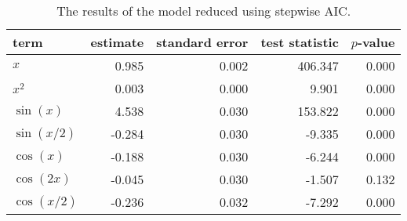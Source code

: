 \begin{table}[t]

\caption{\label{tab:stepwise-regression}The results of the model reduced using stepwise \ac{AIC}.}
\centering
\begin{tabular}{lrrrr}
\toprule
term & estimate & standard error & test statistic & \(p\)-value\\
\midrule
\(x\) & 0.985 & 0.002 & 406.347 & 0.000\\
\(x^2\) & 0.003 & 0.000 & 9.901 & 0.000\\
\(\sin(x)\) & 4.538 & 0.030 & 153.822 & 0.000\\
\(\sin(x/2)\) & -0.284 & 0.030 & -9.335 & 0.000\\
\(\cos(x)\) & -0.188 & 0.030 & -6.244 & 0.000\\
\(\cos(2x)\) & -0.045 & 0.030 & -1.507 & 0.132\\
\(\cos(x/2)\) & -0.236 & 0.032 & -7.292 & 0.000\\
\bottomrule
\end{tabular}
\end{table}